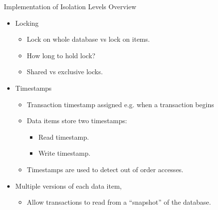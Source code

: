 \documentclass[aspectratio=169]{beamer}
\begin{document}
\begin{frame}{Implementation of Isolation Levels}
    Overview
    \begin{itemize}
        \item Locking
            \begin{itemize}
                \item Lock on whole database vs lock on items.
                \item How long to hold lock?
                \item Shared vs exclusive locks.
            \end{itemize}
        \item Timestamps
            \begin{itemize}
                \item Transaction timestamp assigned e.g. when a transaction begins
                \item Data items store two timestamps:
                    \begin{itemize}
                        \item Read timestamp.
                        \item Write timestamp.
                    \end{itemize}
                \item Timestamps are used to detect out of order accesses.
            \end{itemize}
        \item Multiple versions of each data item,
            \begin{itemize}
             \item Allow transactions to read from a ``snapshot'' of the database.
            \end{itemize}
    \end{itemize}
\end{frame}
\end{document}
